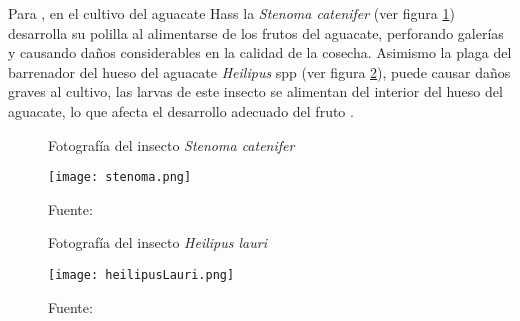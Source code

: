 Para \citet{carabali2022}, en el cultivo del aguacate Hass la \textit{Stenoma catenifer} (ver figura \ref{fig:figuraStenoma}) desarrolla su polilla al alimentarse de los frutos del aguacate, perforando galerías y causando daños considerables en la calidad de la cosecha. Asimismo la plaga del barrenador del hueso del aguacate \textit{Heilipus} spp (ver figura \ref{fig:figuraHeilipus}), puede causar daños graves al cultivo, las  larvas de este insecto se alimentan del interior del hueso del aguacate, lo que afecta el desarrollo adecuado del fruto \citep{carabali2022}.

\newpage

\begin{figure}[h]
\centering
\caption{Fotografía del insecto \textit{Stenoma catenifer}}
\texttt{[image: stenoma.png]}
\caption*{\footnotesize Fuente: \cite{diaz2017}}
\label{fig:figuraStenoma}
\end{figure}

\begin{figure}[h]
\centering
\caption{Fotografía del insecto \textit{Heilipus lauri}}
\texttt{[image: heilipusLauri.png]}
\caption*{\footnotesize Fuente: \cite{palacios2011}}
\label{fig:figuraHeilipus}
\end{figure}